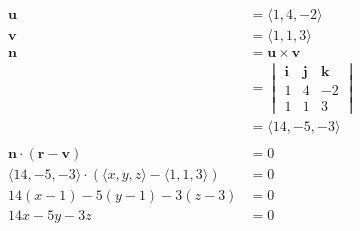 \documentclass{article}
\begin{document}
\setcounter{subsubsection}{42}
\subsubsection{}

\begin{align*}
  \mathbf{u}                                                                           & = \langle 1, 4, -2 \rangle             \\
  \mathbf{v}                                                                           & = \langle 1, 1, 3 \rangle              \\
  \mathbf{n}                                                                           & = \mathbf{u} \times \mathbf{v}         \\
                                                                                       & = \begin{vmatrix}
                                                                                             \mathbf{i} & \mathbf{j} & \mathbf{k} \\
                                                                                             1          & 4          & -2         \\
                                                                                             1          & 1          & 3
                                                                                           \end{vmatrix} \\
                                                                                       & = \langle 14, -5, -3 \rangle           \\ \\
  \mathbf{n} \cdot (\mathbf{r} - \mathbf{v})                                           & = 0                                    \\
  \langle 14, -5, -3 \rangle \cdot (\langle x, y, z \rangle - \langle 1, 1, 3 \rangle) & = 0                                    \\
  14 (x - 1) - 5 (y - 1) - 3 (z - 3)                                                   & = 0                                    \\
  14 x - 5 y - 3 z                                                                     & = 0
\end{align*}

\setcounter{subsubsection}{44}
\subsubsection{}
\end{document}
